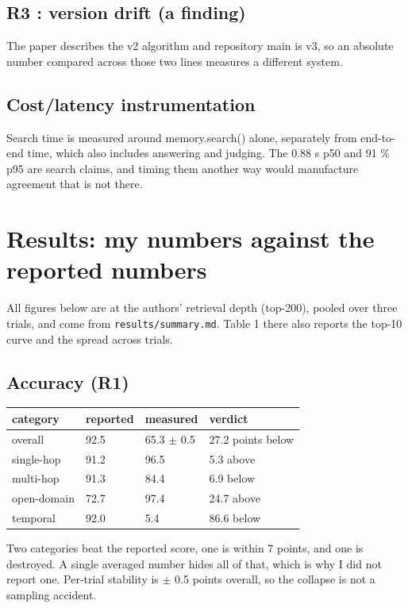 \documentclass[11pt,a4paper]{article}
\begin{document}
\subsection{R3 : version drift (a finding)}

The paper describes the v2 algorithm and repository main is v3, so an absolute number compared across those two lines measures a different system.

\subsection{Cost/latency instrumentation}

Search time is measured around memory.search() alone, separately from end-to-end time, which also includes answering and judging. The 0.88 s p50 and 91 \% p95 are search claims, and timing them another way would manufacture agreement that is not there.

\section{Results: my numbers against the reported numbers}

All figures below are at the authors' retrieval depth (top-200), pooled over three trials, and come from \texttt{results/summary.md}. Table 1 there also reports the top-10 curve and the spread across trials.

\subsection{Accuracy (R1)}

\begin{center}\small
\begin{tabular}{@{}llll@{}}
\toprule
\textbf{category} & \textbf{reported} & \textbf{measured} & \textbf{verdict} \\
\midrule
overall & 92.5 & 65.3 $\pm$ 0.5 & 27.2 points below \\
single-hop & 91.2 & 96.5 & 5.3 above \\
multi-hop & 91.3 & 84.4 & 6.9 below \\
open-domain & 72.7 & 97.4 & 24.7 above \\
temporal & 92.0 & 5.4 & 86.6 below \\
\bottomrule
\end{tabular}
\end{center}

Two categories beat the reported score, one is within 7 points, and one is destroyed. A single averaged number hides all of that, which is why I did not report one. Per-trial stability is $\pm$ 0.5 points overall, so the collapse is not a sampling accident.
\end{document}
